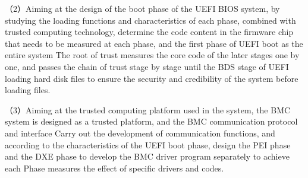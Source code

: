 \begin{eabstract}
\par （2）Aiming at the design of the boot phase of the UEFI BIOS system, by studying the loading 
functions and characteristics of each phase, combined with trusted computing technology, determine 
the code content in the firmware chip that needs to be measured at each phase, and the first phase 
of UEFI boot as the entire system The root of trust measures the core code of the later stages 
one by one, and passes the chain of trust stage by stage until the BDS stage of UEFI loading hard 
disk files to ensure the security and credibility of the system before loading files.
\par （3）Aiming at the trusted computing platform used in the system, the BMC system is designed 
as a trusted platform, and the BMC communication protocol and interface
Carry out the development of communication functions, and according to the characteristics of the 
UEFI boot phase, design the PEI phase and the DXE phase to develop the BMC driver program separately 
to achieve each Phase measures the effect of specific drivers and codes.

\end{eabstract}

